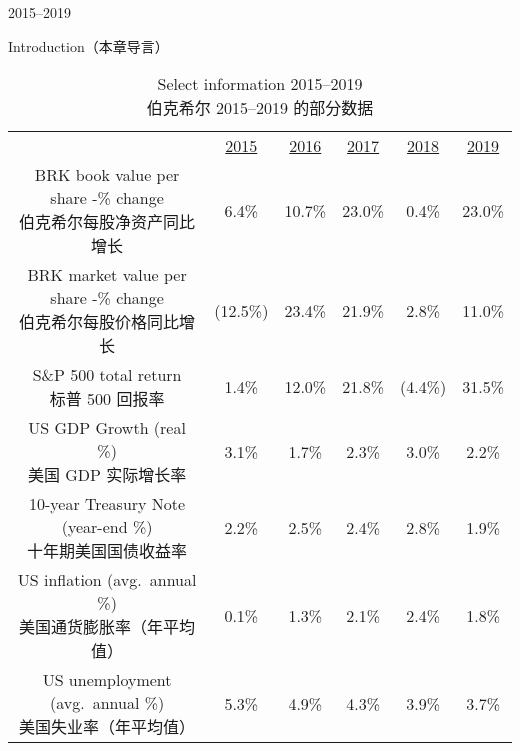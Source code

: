 \begin{chapter}{2015--2019}
\begin{section}{Introduction（本章导言）}
\begin{table}[!htbp]
  \centering
  \begin{center}
    \begin{tabular}{cccccc}
      \toprule
      & \underline{2015} & \underline{2016} & \underline{2017} & \underline{2018} & \underline{2019}  \\
      \makecell[c]{BRK book value per share -\% change \\ 伯克希尔每股净资产同比增长} & 6.4\% & 10.7\% & 23.0\% & 0.4\% & 23.0\% \\
      \makecell[c]{BRK market value per share -\% change \\ 伯克希尔每股价格同比增长} & (12.5\%) & 23.4\% & 21.9\% & 2.8\% & 11.0\% \\
      \makecell[c]{S\&P 500 total return \\ 标普 500 回报率} & 1.4\% & 12.0\% & 21.8\% & (4.4\%) & 31.5\% \\
      \makecell[c]{US GDP Growth (real \%) \\ 美国 GDP 实际增长率} & 3.1\% & 1.7\% & 2.3\% & 3.0\% & 2.2\% \\
      \makecell[c]{10-year Treasury Note (year-end \%) \\ 十年期美国国债收益率} & 2.2\% & 2.5\% & 2.4\% & 2.8\% & 1.9\% \\
      \makecell[c]{US inflation (avg.\ annual \%) \\ 美国通货膨胀率（年平均值）} & 0.1\% & 1.3\% & 2.1\% & 2.4\% & 1.8\% \\
      \makecell[c]{US unemployment (avg.\ annual \%) \\ 美国失业率（年平均值）} & 5.3\% & 4.9\% & 4.3\% & 3.9\% & 3.7\% \\
      \bottomrule
    \end{tabular}
    \caption{Select information 2015--2019 \\ 伯克希尔 2015--2019 的部分数据}
  \end{center}
\end{table}

\end{section}


\end{chapter}
